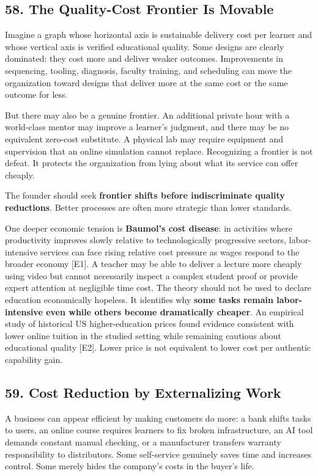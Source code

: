 \subsection*{58. The Quality-Cost Frontier Is Movable}

Imagine a graph whose horizontal axis is sustainable delivery cost per learner and whose vertical axis is verified educational quality. Some designs are clearly dominated: they cost more and deliver weaker outcomes. Improvements in sequencing, tooling, diagnosis, faculty training, and scheduling can move the organization toward designs that deliver more at the same cost or the same outcome for less.

But there may also be a genuine frontier. An additional private hour with a world-class mentor may improve a learner's judgment, and there may be no equivalent zero-cost substitute. A physical lab may require equipment and supervision that an online simulation cannot replace. Recognizing a frontier is not defeat. It protects the organization from lying about what its service can offer cheaply.

The founder should seek \textbf{frontier shifts before indiscriminate quality reductions}. Better processes are often more strategic than lower standards.

One deeper economic tension is \textbf{Baumol's cost disease}: in activities where productivity improves slowly relative to technologically progressive sectors, labor-intensive services can face rising relative cost pressure as wages respond to the broader economy [E1]. A teacher may be able to deliver a lecture more cheaply using video but cannot necessarily inspect a complex student proof or provide expert attention at negligible time cost. The theory should not be used to declare education economically hopeless. It identifies why \textbf{some tasks remain labor-intensive even while others become dramatically cheaper}. An empirical study of historical US higher-education prices found evidence consistent with lower online tuition in the studied setting while remaining cautious about educational quality [E2]. Lower price is not equivalent to lower cost per authentic capability gain.

\subsection*{59. Cost Reduction by Externalizing Work}

A business can appear efficient by making customers do more: a bank shifts tasks to users, an online course requires learners to fix broken infrastructure, an AI tool demands constant manual checking, or a manufacturer transfers warranty responsibility to distributors. Some self-service genuinely saves time and increases control. Some merely hides the company's costs in the buyer's life.


